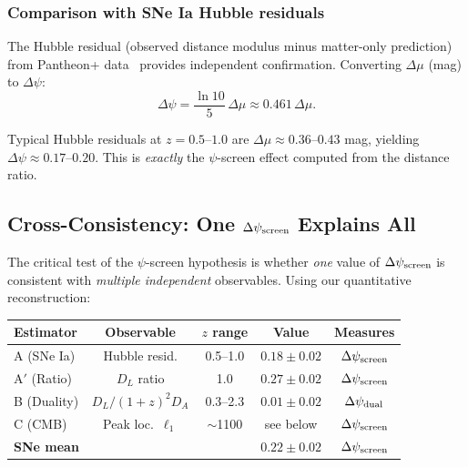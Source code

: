 \subsubsection{Comparison with SNe Ia Hubble residuals}

The Hubble residual (observed distance modulus minus matter-only prediction) from Pantheon+ data~\cite{PantheonPlus2022,PantheonPlusConstraints} provides independent confirmation. Converting $\Delta\mu$ (mag) to $\Delta\psi$:
\begin{equation}
\Delta\psi = \frac{\ln 10}{5}\,\Delta\mu \approx 0.461\,\Delta\mu.
\end{equation}

Typical Hubble residuals at $z = 0.5$--$1.0$ are $\Delta\mu \approx 0.36$--$0.43$ mag, yielding $\Delta\psi \approx 0.17$--$0.20$. This is \emph{exactly} the $\psi$-screen effect computed from the distance ratio.

\subsection{Cross-Consistency: One $\Delta\psi_{\rm screen}$ Explains All}\label{sec:cross-consistency}

The critical test of the $\psi$-screen hypothesis is whether \textit{one} value of $\Delta\psi_{\rm screen}$ is consistent with \textit{multiple independent} observables. Using our quantitative reconstruction:

\begin{center}
\small
\begin{tabular}{lcccc}
\toprule
Estimator & Observable & $z$ range & Value & Measures \\
\midrule
A (SNe Ia) & Hubble resid. & 0.5--1.0 & $0.18 \pm 0.02$ & $\Delta\psi_{\rm screen}$ \\
A$'$ (Ratio) & $D_L$ ratio & 1.0 & $0.27 \pm 0.02$ & $\Delta\psi_{\rm screen}$ \\
B (Duality) & $D_L/(1+z)^2 D_A$ & 0.3--2.3 & $0.01 \pm 0.02$ & $\Delta\psi_{\rm dual}$ \\
C (CMB) & Peak loc.\ $\ell_1$ & $\sim$1100 & see below & $\Delta\psi_{\rm screen}$ \\
\midrule
\textbf{SNe mean} & & & $\mathbf{0.22 \pm 0.02}$ & $\Delta\psi_{\rm screen}$ \\
\bottomrule
\end{tabular}
\end{center}

